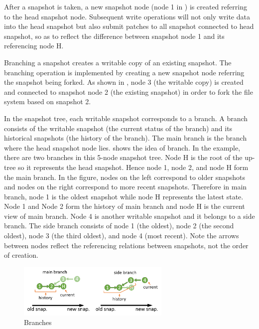     After a snapshot is taken, a new snapshot node (node 1 in ) is created referring to the head snapshot node. Subsequent write operations will not only write data into the head snapshot but also submit patches to all snapshot connected to head snapshot, so as to reflect the difference between snapshot node 1 and its referencing node H.

    Branching a snapshot creates a writable copy of an existing snapshot. The branching operation is implemented by creating a new snapshot node referring the snapshot being forked. As shown in , node 3 (the writable copy) is created and connected to snapshot node 2 (the existing snapshot) in order to fork the file system based on snapshot 2.

    In the snapshot tree, each writable snapshot corresponds to a branch. A branch consists of the writable snapshot (the current status of the branch) and its historical snapshots (the history of the branch). The main branch is the branch where the head snapshot node lies.  shows the idea of branch. In the example, there are two branches in this 5-node snapshot tree. Node H is the root of the up-tree so it represents the head snapshot. Hence node 1, node 2, and node H form the main branch. In the figure, nodes on the left correspond to older snapshots and nodes on the right correspond to more recent snapshots. Therefore in main branch, node 1 is the oldest snapshot while node H represents the latest state. Node 1 and Node 2 form the history of main branch and node H is the current view of main branch. Node 4 is another writable snapshot and it belongs to a side branch. The side branch consists of node 1 (the oldest), node 2 (the second oldest), node 3 (the third oldest), and node 4 (most recent). Note the arrows between nodes reflect the referencing relations between snapshots, not the order of creation.

\begin{figure}[t]
\centering
\includegraphics[width=0.65\textwidth]{Chapter-4/figs/fig22.png}
\caption{Branches}
\label{fig:branches}
\end{figure}

